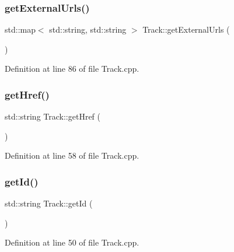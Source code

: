 \mbox{\label{class_track_a9a55f5fee4470234b58869b60554c9db}} 
\subsubsection{\texorpdfstring{get\+External\+Urls()}{getExternalUrls()}}
{\footnotesize\ttfamily std\+::map$<$ std\+::string, std\+::string $>$ Track\+::get\+External\+Urls (\begin{DoxyParamCaption}{ }\end{DoxyParamCaption})}



Definition at line 86 of file Track.\+cpp.

\mbox{\label{class_track_a38774b3b47c36bbf0e3e9de37f965321}} 
\subsubsection{\texorpdfstring{get\+Href()}{getHref()}}
{\footnotesize\ttfamily std\+::string Track\+::get\+Href (\begin{DoxyParamCaption}{ }\end{DoxyParamCaption})}



Definition at line 58 of file Track.\+cpp.

\mbox{\label{class_track_a2368937c06d177b36bf076d97226d0fc}} 
\subsubsection{\texorpdfstring{get\+Id()}{getId()}}
{\footnotesize\ttfamily std\+::string Track\+::get\+Id (\begin{DoxyParamCaption}{ }\end{DoxyParamCaption})}



Definition at line 50 of file Track.\+cpp.

\mbox{\label{class_track_a9d39b6060961da7e97f9e8ece26ebb96}} 
